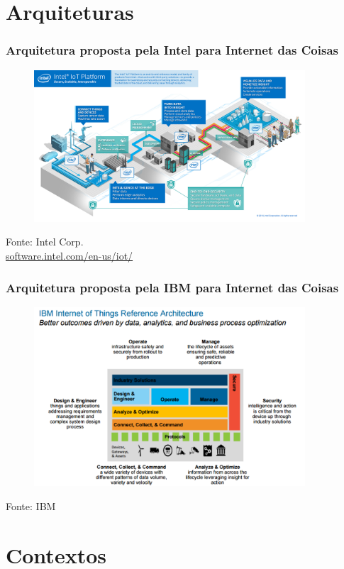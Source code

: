\documentclass{beamer}
\begin{document}
\section{Arquiteturas}

\begin{frame}
	\frametitle{Arquitetura proposta pela Intel para Internet das Coisas}
	\begin{figure}
		\includegraphics[width=0.9\textwidth]{inteliotplatform}
	\end{figure}
	\scriptsize Fonte: Intel Corp.\\
	\tiny \url{software.intel.com/en-us/iot/}
\end{frame}

\begin{frame}
\frametitle{Arquitetura proposta pela IBM para Internet das Coisas}
\begin{figure}
	\includegraphics[width=0.9\textwidth]{arquiteturaiotibm}
\end{figure}
\scriptsize Fonte: IBM
\end{frame}

\section{Contextos}
\end{document}
